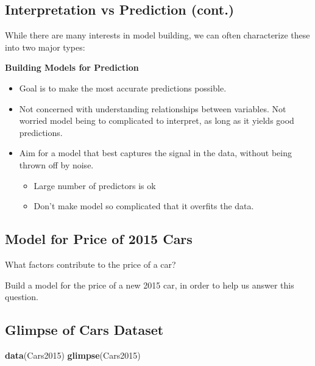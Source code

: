 \documentclass[]{book}
\newenvironment{Shaded}{\begin{snugshade}}{\end{snugshade}}
\newcommand{\KeywordTok}[1]{\textcolor[rgb]{0.13,0.29,0.53}{\textbf{#1}}}
\newcommand{\NormalTok}[1]{#1}
\providecommand{\tightlist}{%
  \setlength{\itemsep}{0pt}\setlength{\parskip}{0pt}}
\begin{document}
\subsection{Interpretation vs Prediction
(cont.)}\label{interpretation-vs-prediction-cont.}

While there are many interests in model building, we can often
characterize these into two major types:

\textbf{Building Models for Prediction}

\begin{itemize}
\tightlist
\item
  Goal is to make the most accurate predictions possible.\\
\item
  Not concerned with understanding relationships between variables. Not
  worried model being to complicated to interpret, as long as it yields
  good predictions.\\
\item
  Aim for a model that best captures the signal in the data, without
  being thrown off by noise.

  \begin{itemize}
  \tightlist
  \item
    Large number of predictors is ok\\
  \item
    Don't make model so complicated that it overfits the data.
  \end{itemize}
\end{itemize}

\subsection{Model for Price of 2015
Cars}\label{model-for-price-of-2015-cars}

What factors contribute to the price of a car?

Build a model for the price of a new 2015 car, in order to help us
answer this question.

\subsection{Glimpse of Cars Dataset}\label{glimpse-of-cars-dataset}

\begin{Shaded}
\begin{Highlighting}[]
\KeywordTok{data}\NormalTok{(Cars2015)}
\KeywordTok{glimpse}\NormalTok{(Cars2015)}
\end{Highlighting}
\end{Shaded}
\end{document}

